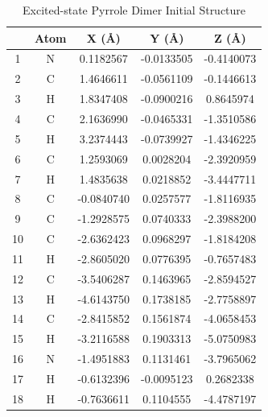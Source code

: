 \begin{table}[hbt!]\centering
\caption{Excited-state Pyrrole Dimer Initial Structure}
\renewcommand{\arraystretch}{1.5}
\begin{threeparttable}
\begin{tabular}{ccccc}\toprule
{} & {Atom} & {X (\AA)} & {Y (\AA)} & {Z (\AA)} \\ \midrule
    1  & N &  0.1182567 & -0.0133505 & -0.4140073\\
    2  & C &  1.4646611 & -0.0561109 & -0.1446613\\
    3  & H &  1.8347408 & -0.0900216 &  0.8645974\\
    4  & C &  2.1636990 & -0.0465331 & -1.3510586\\
    5  & H &  3.2374443 & -0.0739927 & -1.4346225\\
    6  & C &  1.2593069 &  0.0028204 & -2.3920959\\ \midrule
    7  & H &  1.4835638 &  0.0218852 & -3.4447711\\
    8  & C & -0.0840740 &  0.0257577 & -1.8116935\\
    9  & C & -1.2928575 &  0.0740333 & -2.3988200\\
    10 & C & -2.6362423 &  0.0968297 & -1.8184208\\
    11 & H & -2.8605020 &  0.0776395 & -0.7657483\\
    12 & C & -3.5406287 &  0.1463965 & -2.8594527\\ \midrule
    13 & H & -4.6143750 &  0.1738185 & -2.7758897\\
    14 & C & -2.8415852 &  0.1561874 & -4.0658453\\
    15 & H & -3.2116588 &  0.1903313 & -5.0750983\\
    16 & N & -1.4951883 &  0.1131461 & -3.7965062\\
    17 & H & -0.6132396 & -0.0095123 &  0.2682338\\
    18 & H & -0.7636611 &  0.1104555 & -4.4787197\\ \bottomrule
\end{tabular}
\begin{tablenotes}
\item
\end{tablenotes}
\end{threeparttable}
\end{table}

